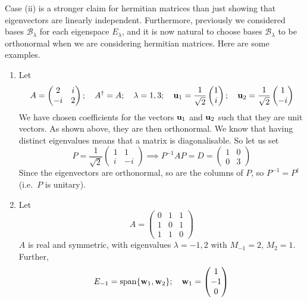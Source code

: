 Case (ii) is a stronger claim for hermitian matrices than just showing that eigenvectors are linearly independent.
Furthermore, previously we considered bases \(\mathcal B_\lambda\) for each eigenspace \(E_\lambda\), and it is now natural to choose bases \(\mathcal B_\lambda\) to be orthonormal when we are considering hermitian matrices.
Here are some examples.
\begin{enumerate}
	\item Let
	      \[
		      A = \begin{pmatrix}
			      2 & i \\ -i & 2
		      \end{pmatrix};\quad A^\dagger = A;\quad \lambda = 1, 3;\quad\vb u_1 = \frac{1}{\sqrt{2}} \begin{pmatrix}
			      1 \\i
		      \end{pmatrix};\quad\vb u_2 = \frac{1}{\sqrt{2}} \begin{pmatrix}
			      1 \\-i
		      \end{pmatrix}
	      \]
	      We have chosen coefficients for the vectors \(\vb u_1\) and \(\vb u_2\) such that they are unit vectors.
	      As shown above, they are then orthonormal.
	      We know that having distinct eigenvalues means that a matrix is diagonalisable.
	      So let us set
	      \[
		      P =  \frac{1}{\sqrt{2}} \begin{pmatrix}
			      1 & 1 \\ i & -i
		      \end{pmatrix} \implies P^{-1}AP = D = \begin{pmatrix}
			      1 & 0 \\ 0 & 3
		      \end{pmatrix}
	      \]
	      Since the eigenvectors are orthonormal, so are the columns of \(P\), so \(P^{-1} = P^\dagger\) (i.e.\ \(P\) is unitary).
	\item Let
	      \[
		      A = \begin{pmatrix}
			      0 & 1 & 1 \\ 1 & 0 & 1 \\ 1 & 1 & 0
		      \end{pmatrix}
	      \]
	      \(A\) is real and symmetric, with eigenvalues \(\lambda = -1, 2\) with \(M_{-1} = 2\), \(M_2 = 1\).
	      Further,
	      \[
		      E_{-1} = \operatorname{span} \{ \vb w_1, \vb w_2 \};\quad \vb w_1 = \begin{pmatrix}
			      1 \\ -1 \\ 0

\end{pmatrix}\]
\end{enumerate}
